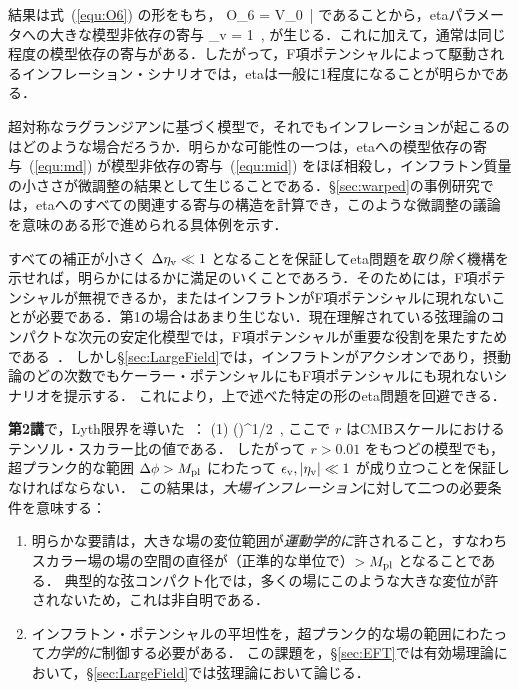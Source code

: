 結果は式~(\ref{equ:O6}) の形をもち，
\beq
{\cal O}_6 =   V_0\, \phi\bar\phi
\eeq
であることから，etaパラメータへの大きな模型非依存の寄与
\beq
\label{equ:sugraETA}
\Delta \eta_{\rm v} = 1\, ,
\eeq
が生じる．これに加えて，通常は同じ程度の模型依存の寄与がある．したがって，F項ポテンシャルによって駆動されるインフレーション・シナリオでは，etaは一般に1程度になることが明らかである．

超対称なラグランジアンに基づく模型で，それでもインフレーションが起こるのはどのような場合だろうか．明らかな可能性の一つは，etaへの模型依存の寄与~(\ref{equ:md}) が模型非依存の寄与~(\ref{equ:mid}) をほぼ相殺し，インフラトン質量の小ささが微調整の結果として生じることである．\S\ref{sec:warped}の事例研究では，etaへのすべての関連する寄与の構造を計算でき，このような微調整の議論を意味のある形で進められる具体例を示す．

すべての補正が小さく $\Delta \eta_{\rm v} \ll 1$ となることを保証してeta問題を{\it 取り除く}機構を示せれば，明らかにはるかに満足のいくことであろう．そのためには，F項ポテンシャルが無視できるか，またはインフラトンがF項ポテンシャルに現れないことが必要である．第1の場合はあまり生じない．現在理解されている弦理論のコンパクトな次元の安定化模型では，F項ポテンシャルが重要な役割を果たすためである~\cite{KKLT}．
しかし\S\ref{sec:LargeField}では，インフラトンがアクシオンであり，摂動論のどの次数でもケーラー・ポテンシャルにもF項ポテンシャルにも現れないシナリオを提示する．
これにより，上で述べた特定の形のeta問題を回避できる．


\label{sec:lyth}

{\bf 第2講}で，Lyth限界を導いた~\cite{Lyth:1996im}：
\beq
{} (1) \left(\right)^{1/2}\, ,
\eeq
ここで $r$ はCMBスケールにおけるテンソル・スカラー比の値である．
したがって $r >0.01$ をもつどの模型でも，超プランク的な範囲 $\Delta \phi > M_{\rm pl}$ にわたって $\epsilon_{\rm v}, |\eta_{\rm v}| \ll 1$ が成り立つことを保証しなければならない．
この結果は，{\it 大場インフレーション}に対して二つの必要条件を意味する：
\begin{enumerate}
\item[i)] 明らかな要請は，大きな場の変位範囲が{\it 運動学的に}許されること，すなわちスカラー場の場の空間の直径が（正準的な単位で）$> M_{\rm pl}$ となることである．
典型的な弦コンパクト化では，多くの場にこのような大きな変位が許されないため，これは非自明である．
\item[ii)] インフラトン・ポテンシャルの平坦性を，超プランク的な場の範囲にわたって{\it 力学的に}制御する必要がある．
この課題を，\S\ref{sec:EFT}では有効場理論において，\S\ref{sec:LargeField}では弦理論において論じる．
\end{enumerate}

